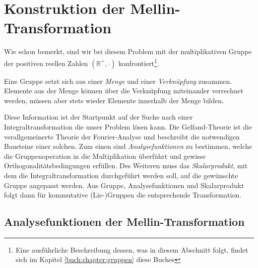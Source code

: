 %
%
%

\section{Konstruktion der Mellin-Transformation
\label{mellin:section:teil2}}
Wie schon bemerkt, sind wir bei diesem Problem mit der multiplikativen 
Gruppe der positiven reellen Zahlen $(\mathbb{R^+},\cdot)$ 
konfrontiert\footnote
{Eine ausführliche Beschreibung dessen, was in diesem Abschnitt 
folgt, findet sich im Kapitel \ref{buch:chapter:gruppen} diese Buches}.
\begin{definition}
    Eine Gruppe setzt sich aus einer {\em Menge} und einer 
    {\em Verknüpfung} zusammen. 
    Elemente aus der Menge können über die Verknüpfung miteinander 
    verrechnet werden, müssen aber stets wieder Elemente innerhalb 
    der Menge bilden.
\end{definition}
Diese Information ist der Startpunkt auf der Suche nach einer 
Integraltransformation die unser Problem lösen kann.
Die Gelfand-Theorie ist die verallgemeinerte Theorie der 
Fourier-Analyse und beschreibt die notwendigen Bausteine einer solchen.
Zum einen sind {\em Analysefunktionen} zu bestimmen, welche die 
Gruppenoperation in die Multiplikation überführt und gewisse 
Orthogonalitätsbedingungen erfüllen. 
Des Weiteren muss das {\em Skalarprodukt}, mit dem die 
Integraltransformation durchgeführt werden soll, auf die gewünschte 
Gruppe angepasst werden.
Aus Gruppe, Analysefunktionen und Skalarprodukt folgt dann
für kommutative (Lie-)Gruppen die entsprechende Transformation.


\subsection{Analysefunktionen der Mellin-Transformation
\label{mellin:subsection:analysefunktionen}}

